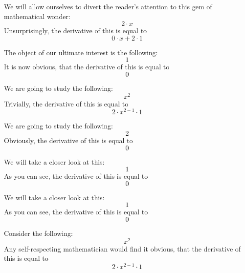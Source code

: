 \documentclass{article}
\begin{document}
We will allow ourselves to divert the reader's attention to this gem of mathematical wonder:
\begin{equation}
2 \cdot x 
\end{equation}
Unsurprisingly, the derivative of this is equal to
\begin{equation}
0 \cdot x + 2 \cdot 1 
\end{equation}

The object of our ultimate interest is the following:
\begin{equation}
1 
\end{equation}
It is now obvious, that the derivative of this is equal to
\begin{equation}
0 
\end{equation}

We are going to study the following:
\begin{equation}
x ^{2 } 
\end{equation}
Trivially, the derivative of this is equal to
\begin{equation}
2 \cdot x ^{2 - 1 } \cdot 1 
\end{equation}

We are going to study the following:
\begin{equation}
2 
\end{equation}
Obviously, the derivative of this is equal to
\begin{equation}
0 
\end{equation}

We will take a closer look at this:
\begin{equation}
1 
\end{equation}
As you can see, the derivative of this is equal to
\begin{equation}
0 
\end{equation}

We will take a closer look at this:
\begin{equation}
1 
\end{equation}
As you can see, the derivative of this is equal to
\begin{equation}
0 
\end{equation}

Consider the following:
\begin{equation}
x ^{2 } 
\end{equation}
Any self-respecting mathematician would find it obvious, that the derivative of this is equal to
\begin{equation}
2 \cdot x ^{2 - 1 } \cdot 1 
\end{equation}
\end{document}

